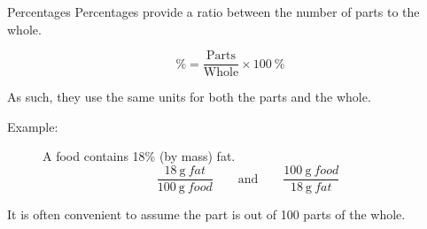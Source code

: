\documentclass[10pt,letterpaper,twoside]{article}
\begin{document}
\begin{frame}{Percentages}
	Percentages provide a \alert{ratio} between the number of parts to the
	whole.

	\begin{equation*}
		\si{\percent} = \frac{\text{Parts}}{\text{Whole}} \times \SI{100}{\percent}
	\end{equation*}

	As such, they use the same units for both the parts and the whole.
	\begin{description}
		\item[Example:] A food contains 18\% (by mass) fat.
			\begin{equation*}
				\frac{\SI{18}{\gram~fat}}{\SI{100}{\gram~food}}
				\qquad\text{and}\qquad
				\frac{\SI{100}{\gram~food}}{\SI{18}{\gram~fat}}
			\end{equation*}
	\end{description}

	It is often \alert{convenient} to assume the part is out of 100 parts of
	the whole.
\end{frame}
\end{document}
